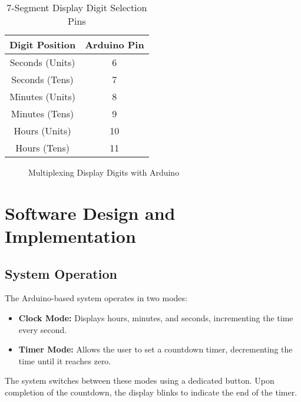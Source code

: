 \documentclass[a4paper,12pt]{article}
\begin{document}
\begin{table}[H]
    \centering
    \begin{tabular}{|c|c|}
        \hline
        \textbf{Digit Position} & \textbf{Arduino Pin} \\
        \hline
        Seconds (Units) & 6 \\
        Seconds (Tens)  & 7 \\
        Minutes (Units) & 8 \\
        Minutes (Tens)  & 9 \\
        Hours (Units)   & 10 \\
        Hours (Tens)    & 11 \\
        \hline
    \end{tabular}
    \caption{7-Segment Display Digit Selection Pins}
    \label{tab:display_pins}
\end{table}

\begin{figure}[H]
\centering
{}
\caption{Multiplexing Display Digits with Arduino}
\label{fig:multiplexing}
\end{figure}

\section{Software Design and Implementation}
\subsection{System Operation}
The Arduino-based system operates in two modes:
\begin{itemize}
    \item \textbf{Clock Mode:} Displays hours, minutes, and seconds, incrementing the time every second.
    \item \textbf{Timer Mode:} Allows the user to set a countdown timer, decrementing the time until it reaches zero.
\end{itemize}
The system switches between these modes using a dedicated button. Upon completion of the countdown, the display blinks to indicate the end of the timer.
\end{document}
